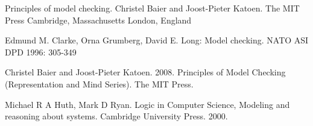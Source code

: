\documentclass[titlepage, 12pt]{book}
\begin{document}
\begin{thebibliography}{99}
 Principles of model checking. Christel Baier and Joost-Pieter Katoen. The MIT Press Cambridge, Massachusetts
London, England

 Edmund M. Clarke, Orna Grumberg, David E. Long: Model checking. NATO ASI DPD 1996: 305-349

 Christel Baier and Joost-Pieter Katoen. 2008. Principles of Model Checking (Representation and Mind Series). The MIT Press.

 Michael R A Huth, Mark D Ryan. Logic in Computer Science, Modeling and reasoning about systems. Cambridge University Press. 2000.

\end{thebibliography}

\end{document}
